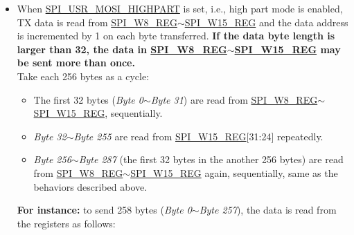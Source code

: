 \documentclass[main\_\_EN.tex]{subfiles}
\begin{document}
\begin{itemize}
\begin{itemize}
\begin{itemize}
            \item \emph{Byte 64}$\sim$\emph{Byte 255} are read from \hyperref[regdesc:SPIW15REG]{SPI\_W15\_REG}[31:24] repeatedly.
            \item The other bytes (\emph{Byte 256} and \emph{Byte 257}) are read from \hyperref[regdesc:SPIW0REG]{SPI\_W0\_REG}[7:0] and \hyperref[regdesc:SPIW0REG]{SPI\_W0\_REG}[15:8] again, sequentially. The logic is:
            \begin{itemize}
                \item The address to read data for \emph{Byte 256} is the result of (256 \% 64 = 0), i.e., \hyperref[regdesc:SPIW0REG]{SPI\_W0\_REG}[7:0].
                \item The address to read data for \emph{Byte 257} is the result of (257 \% 64 = 1), i.e., \hyperref[regdesc:SPIW0REG]{SPI\_W0\_REG}[15:8].
            \end{itemize}
        \end{itemize}
        \item When \hyperref[fielddesc:SPIUSRMOSIHIGHPART]{SPI\_USR\_MOSI\_HIGHPART} is set, i.e., high part mode is enabled, TX data is read from \hyperref[regdesc:SPIW8REG]{SPI\_W8\_REG}$\sim$\hyperref[regdesc:SPIW15REG]{SPI\_W15\_REG} and the data address is incremented by 1 on each byte transferred. \textbf{If the data byte length is larger than 32, the data in \hyperref[regdesc:SPIW8REG]{SPI\_W8\_REG}$\sim$\hyperref[regdesc:SPIW15REG]{SPI\_W15\_REG} may be sent more than once.} \\ 
        Take each 256 bytes as a cycle:
        \begin{itemize}
            \item The first 32 bytes (\emph{Byte 0}$\sim$\emph{Byte 31}) are read from \hyperref[regdesc:SPIW8REG]{SPI\_W8\_REG}$\sim$\hyperref[regdesc:SPIW15REG]{SPI\_W15\_REG}, sequentially.
            \item \emph{Byte 32}$\sim$\emph{Byte 255} are read from \hyperref[regdesc:SPIW15REG]{SPI\_W15\_REG}[31:24] repeatedly.
            \item \emph{Byte 256}$\sim$\emph{Byte 287} (the first 32 bytes in the another 256 bytes) are read from \hyperref[regdesc:SPIW8REG]{SPI\_W8\_REG}$\sim$\hyperref[regdesc:SPIW15REG]{SPI\_W15\_REG} again, sequentially, same as the behaviors described above.
        \end{itemize}
        \textbf{For instance:} to send 258 bytes (\emph{Byte 0}$\sim$\emph{Byte 257}), the data is read from the registers as follows:

\end{itemize}
\end{itemize}
\end{document}
